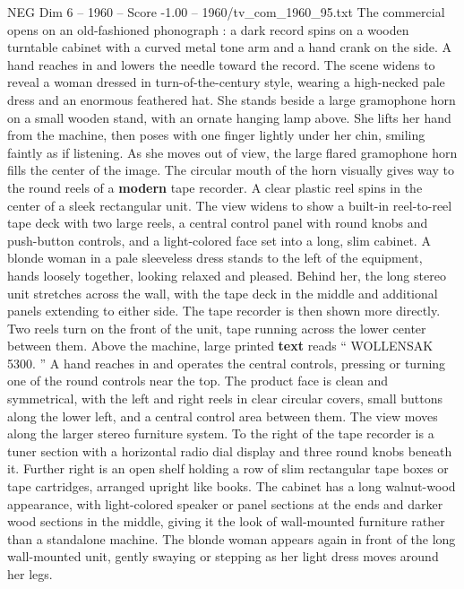 \begin{textsample}{NEG Dim 6 – 1960 – Score -1.00 – 1960/tv\_com\_1960\_95.txt}  \label{ex:f6_neg_077}
The commercial opens on an old-fashioned phonograph : a dark record spins on a wooden turntable cabinet with a curved metal tone arm and a hand crank on the side.
A hand reaches in and lowers the needle toward the record.
The scene widens to reveal a woman dressed in turn-of-the-century style, wearing a high-necked pale dress and an enormous feathered hat.
She stands beside a large gramophone horn on a small wooden stand, with an ornate hanging lamp above.
She lifts her hand from the machine, then poses with one finger lightly under her chin, smiling faintly as if listening.
As she moves out of view, the large flared gramophone horn fills the center of the image.
The circular mouth of the horn visually gives way to the round reels of a \textbf{modern} tape recorder.
A clear plastic reel spins in the center of a sleek rectangular unit.
The view widens to show a built-in reel-to-reel tape deck with two large reels, a central control panel with round knobs and push-button controls, and a light-colored face set into a long, slim cabinet.
A blonde woman in a pale sleeveless dress stands to the left of the equipment, hands loosely together, looking relaxed and pleased.
Behind her, the long stereo unit stretches across the wall, with the tape deck in the middle and additional panels extending to either side.
The tape recorder is then shown more directly.
Two reels turn on the front of the unit, tape running across the lower center between them.
Above the machine, large printed \textbf{text} reads “ WOLLENSAK 5300. ” A hand reaches in and operates the central controls, pressing or turning one of the round controls near the top.
The product face is clean and symmetrical, with the left and right reels in clear circular covers, small buttons along the lower left, and a central control area between them.
The view moves along the larger stereo furniture system.
To the right of the tape recorder is a tuner section with a horizontal radio dial display and three round knobs beneath it.
Further right is an open shelf holding a row of slim rectangular tape boxes or tape cartridges, arranged upright like books.
The cabinet has a long walnut-wood appearance, with light-colored speaker or panel sections at the ends and darker wood sections in the middle, giving it the look of wall-mounted furniture rather than a standalone machine.
The blonde woman appears again in front of the long wall-mounted unit, gently swaying or stepping as her light dress moves around her legs.

\end{textsample}
